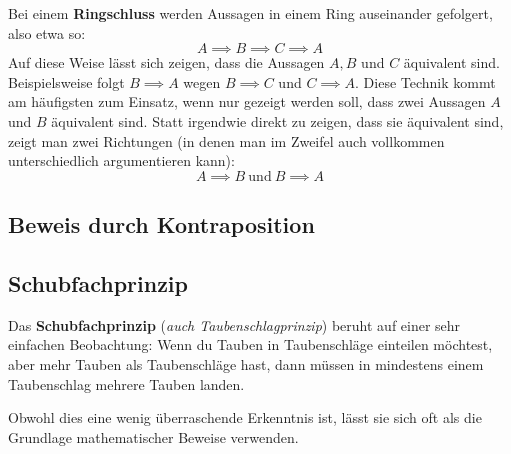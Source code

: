 \documentclass[../../main.tex]{subfiles}
\begin{document}
    Bei einem \textbf{Ringschluss} werden Aussagen in einem Ring auseinander gefolgert, also etwa so:
    \[A\implies B\implies C\implies A\]
    Auf diese Weise lässt sich zeigen, dass die Aussagen $A,B$ und $C$ äquivalent sind. Beispielsweise folgt $B\implies A$ wegen $B\implies C$ und $C\implies A$. Diese Technik kommt am häufigsten zum Einsatz, wenn nur gezeigt werden soll, dass zwei Aussagen $A$ und $B$ äquivalent sind. Statt irgendwie direkt zu zeigen, dass sie äquivalent sind, zeigt man zwei Richtungen (in denen man im Zweifel auch vollkommen unterschiedlich argumentieren kann):
    \[A\implies B~\text{und}~B\implies A\]
    \begin{example}{}
        
    \end{example}

    \subsection*{Beweis durch Kontraposition}
    \subsection*{Schubfachprinzip}
    Das \textbf{Schubfachprinzip} (\emph{auch Taubenschlagprinzip}) beruht auf einer sehr einfachen Beobachtung: Wenn du Tauben in Taubenschläge einteilen möchtest, aber mehr Tauben als Taubenschläge hast, dann müssen in mindestens einem Taubenschlag mehrere Tauben landen.
    
    Obwohl dies eine wenig überraschende Erkenntnis ist, lässt sie sich oft als die Grundlage mathematischer Beweise verwenden.
    
\end{document}
